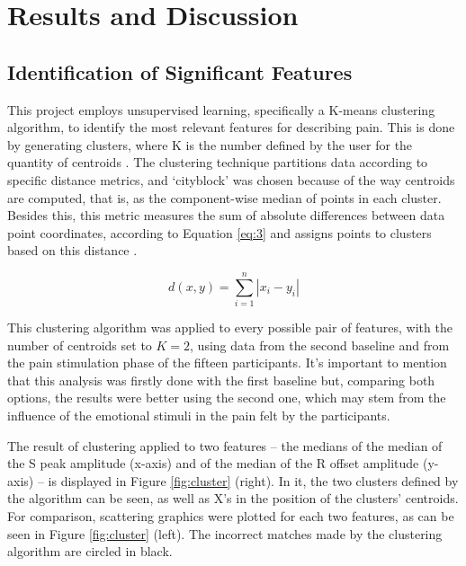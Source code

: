 \chapter{Results and Discussion}

\section{Identification of Significant Features}

This project employs unsupervised learning, specifically a K-means clustering algorithm, to identify the most relevant features for describing pain. This is done by generating clusters, where K is the number defined by the user for the quantity of centroids \cite{Ikotun2023}. The clustering technique partitions data according to specific distance metrics, and `cityblock' was chosen because of the way centroids are computed, that is, as the component-wise median of points in each cluster. Besides this, this metric measures the sum of absolute differences between data point coordinates, according to Equation \ref{eq:3} and assigns points to clusters based on this distance \cite{Ricken2023}.

\begin{equation} \label{eq:3}
d(x,y)=\sum_{i=1}^{n}\left| x_i-y_i \right|
\end{equation}

This clustering algorithm was applied to every possible pair of features, with the number of centroids set to $K=2$, using data from the second baseline and from the pain stimulation phase of the fifteen participants. It's important to mention that this analysis was firstly done with the first baseline but, comparing both options, the results were better using the second one, which may stem from the influence of the emotional stimuli in the pain felt by the participants.

The result of clustering applied to two features -- the medians of the median of the S peak amplitude (x-axis) and of the median of the R offset amplitude (y-axis) -- is displayed in Figure \ref{fig:cluster} (right). In it, the two clusters defined by the algorithm can be seen, as well as X's in the position of the clusters' centroids.
For comparison, scattering graphics were plotted for each two features, as can be seen in Figure \ref{fig:cluster} (left). The incorrect matches made by the clustering algorithm are circled in black.


